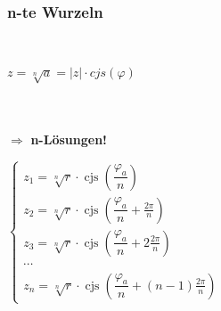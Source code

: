 		\subsubsection{n-te Wurzeln}
			\\[1pt]
			\begin{minipage}[c]{0.2\textwidth}
				$z = \sqrt[n]{a} = \left| z \right| \cdot cjs(\varphi)$\\[3pt]
				\\[3pt]
				\\[3pt]
			\end{minipage}
			\begin{minipage}[c]{0.2\textwidth}
				$\Rightarrow$ \textbf{n-Lösungen!}
			\end{minipage}
			\begin{minipage}[c]{0.3\textwidth}
				$\left\{
					\begin{array}{l}
						z_{1}=\sqrt[n]{r} \cdot \operatorname{cjs}\left(\dfrac{\varphi_{a}}{n}\right) \\[6pt] 
						z_{2}=\sqrt[n]{r} \cdot \operatorname{cjs}\left(\dfrac{\varphi_{a}}{n}+\frac{2 \pi}{n}\right) \\[6pt]
						z_{3}=\sqrt[n]{r} \cdot \operatorname{cjs}\left(\dfrac{\varphi_{a}}{n}+2 \frac{2 \pi}{n}\right) \\[6pt]
						\cdots \\ 
						z_{n}=\sqrt[n]{r} \cdot \operatorname{cjs}\left(\dfrac{\varphi_{a}}{n}+(n-1) \frac{2 \pi}{n}\right)
					\end{array}
				\right.$
			\end{minipage}
			\begin{minipage}[c]{0.2\textwidth}
				\scalebox{0.65}{}
			\end{minipage}
		
